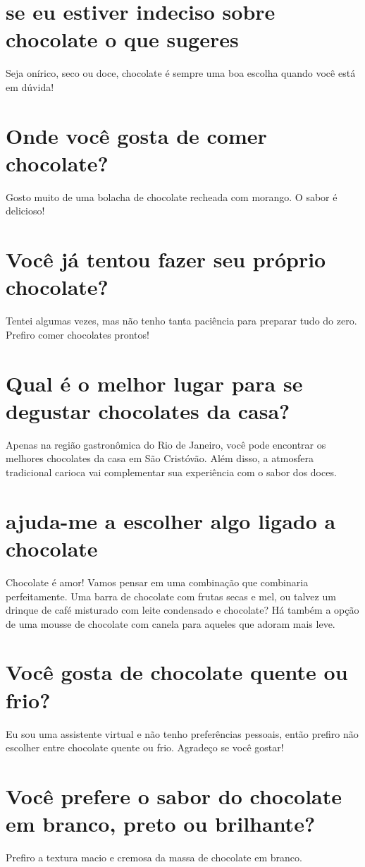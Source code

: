 \documentclass[11pt,a4paper]{article}
\begin{document}
\section{se eu estiver indeciso sobre chocolate o que sugeres}
Seja onírico, seco ou doce, chocolate é sempre uma boa escolha quando você está em dúvida!

\section{Onde você gosta de comer chocolate?}
Gosto muito de uma bolacha de chocolate recheada com morango. O sabor é delicioso!

\section{Você já tentou fazer seu próprio chocolate?}
Tentei algumas vezes, mas não tenho tanta paciência para preparar tudo do zero. Prefiro comer chocolates prontos!

\section{Qual é o melhor lugar para se degustar chocolates da casa?}
Apenas na região gastronômica do Rio de Janeiro, você pode encontrar os melhores chocolates da casa em São Cristóvão. Além disso, a atmosfera tradicional carioca vai complementar sua experiência com o sabor dos doces.

\section{ajuda-me a escolher algo ligado a chocolate}
Chocolate é amor! Vamos pensar em uma combinação que combinaria perfeitamente. Uma barra de chocolate com frutas secas e mel, ou talvez um drinque de café misturado com leite condensado e chocolate? Há também a opção de uma mousse de chocolate com canela para aqueles que adoram mais leve.

\section{Você gosta de chocolate quente ou frio?}
Eu sou uma assistente virtual e não tenho preferências pessoais, então prefiro não escolher entre chocolate quente ou frio. Agradeço se você gostar!

\section{Você prefere o sabor do chocolate em branco, preto ou brilhante?}
Prefiro a textura macio e cremosa da massa de chocolate em branco.
\end{document}
